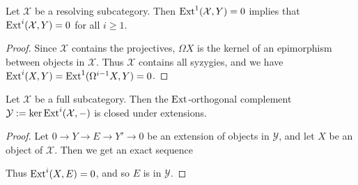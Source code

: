 \begin{lemma}\label{lem:resolving_ext_vanish}
	Let $\mathcal X$ be a resolving subcategory. Then $\operatorname{Ext}^1(\mathcal X, Y) = 0$ implies that $\operatorname{Ext}^i(\mathcal X, Y)=0$ for all $i \geq 1$.
	\begin{proof}
		Since $\mathcal X$ contains the projectives, $\Omega X$ is the kernel of an epimorphism between objects in $\mathcal X$. Thus $\mathcal X$ contains all syzygies, and we have $\operatorname{Ext}^i(X, Y) = \operatorname{Ext}^1(\Omega^{i-1}X, Y) = 0$.
	\end{proof}
\end{lemma}

\begin{prop}\label{prop:complement_closed_under_extension}
	Let $\mathcal X$ be a full subcategory. Then the $\operatorname{Ext}$-orthogonal complement $\mathcal Y := \ker\operatorname{Ext}^{i}(\mathcal X, -)$ is closed under extensions.
	\begin{proof}
		Let $0 \to Y \to E \to Y' \to 0$ be an extension of objects in $\mathcal Y$, and let $X$ be an object of $\mathcal X$. Then we get an exact sequence  
		\begin{center}
		\end{center}
		Thus $\operatorname{Ext}^i(X, E)=0$, and so $E$ is in $\mathcal Y$.
	\end{proof}
\end{prop}

